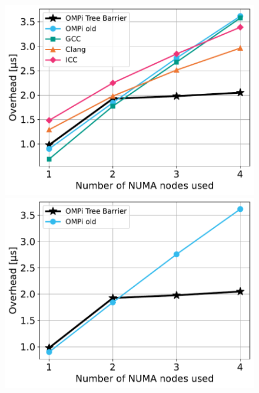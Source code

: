 
\begin{figure}[htbp]
    \centering
    \begin{minipage}{0.48\textwidth}
        \centering
        \includegraphics[width=1\textwidth]{Figures/paragon-epcc/toponodes_tpn-6_close.pdf}
    \end{minipage}\hfill
    \begin{minipage}{0.48\textwidth}
        \centering
        \includegraphics[width=1\textwidth]{Figures/paragon-epcc/ompionly_toponodes_tpn-6_close.pdf}

\end{minipage}
\end{figure}
